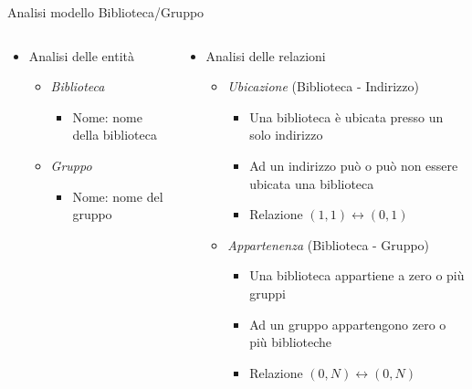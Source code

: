 \begin{frame}{Analisi modello Biblioteca/Gruppo}
    \begin{columns}[c]
        \begin{column}[T]{.35\textwidth}
            \begin{itemize}
                \item Analisi delle entità
                    \begin{itemize}
                        \item \textit{Biblioteca}
                            \begin{itemize}
                                \item Nome: nome della biblioteca
                            \end{itemize}
                        \item \textit{Gruppo}
                            \begin{itemize}
                                \item Nome: nome del gruppo
                            \end{itemize}
                    \end{itemize}
            \end{itemize}
        \end{column}
        \begin{column}[T]{.65\textwidth}
            \begin{itemize}
                \item Analisi delle relazioni
                    \begin{itemize}
                        \item \textit{Ubicazione} (Biblioteca - Indirizzo)
                            \begin{itemize}
                                \item Una biblioteca è ubicata presso un solo indirizzo
                                \item Ad un indirizzo può o può non essere ubicata una biblioteca
                                \item Relazione $(1,1) \leftrightarrow (0,1)$
                            \end{itemize}
                        \item \textit{Appartenenza} (Biblioteca - Gruppo)
                            \begin{itemize}
                                \item Una biblioteca appartiene a zero o più gruppi
                                \item Ad un gruppo appartengono zero o più biblioteche
                                \item Relazione $(0,N) \leftrightarrow (0,N)$
                            \end{itemize}
                    \end{itemize}
            \end{itemize}
        \end{column}
    \end{columns}
\end{frame}

